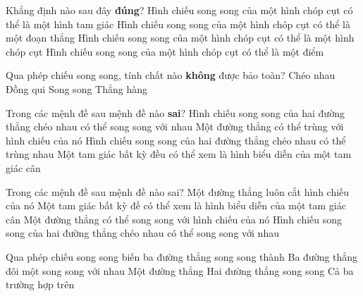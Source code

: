\begin{ex}%
	Khẳng định nào sau đây \textbf{đúng}? 
	 \choice
		{\True Hình chiếu song song của một hình chóp  cụt có thể là một hình tam giác}
		{Hình chiếu song song của một hình chóp cụt có  thể là một đoạn thẳng}
		{Hình chiếu song song của một hình chóp cụt có  thể là một hình chóp cụt}
		{Hình chiếu song song của một hình chóp cụt  có thể là một điểm}
\end{ex}

\begin{ex}%
	Qua  phép chiếu song song, tính chất nào \textbf{không} được bảo toàn?
	 \choice
		{\True  Chéo nhau}
		 {Đồng qui}
		 {Song song}
		{Thẳng hàng} 
\end{ex}

\begin{ex}%
	Trong các mệnh đề sau mệnh đề  nào \textbf{sai}?
	 \choice
		 {Hình chiếu song song của hai đường thẳng chéo nhau có thể song song với nhau}
		{Một đường thẳng  có thể trùng với hình chiếu của nó}
		{\True Hình chiếu song  song của hai đường thẳng chéo nhau có thể trùng nhau}
		{Một tam giác bất kỳ đều có thể xem là hình biểu diễn  của một tam giác cân}
\end{ex}

\begin{ex}%
	Trong các mệnh đề  sau mệnh đề nào sai?
	 \choice
		{\True Một đường thẳng luôn  cắt hình chiếu của nó}
		{Một tam giác bất kỳ đề  có thể xem là hình biểu diễn của một tam giác cân}
		{Một đường thẳng có thể song song với hình chiếu của nó} 
		{Hình chiếu song song của  hai đường thẳng chéo nhau có thể song song với nhau}
\end{ex}

\begin{ex}%
	Qua phép chiếu  song song biến ba đường thẳng song song thành
	\choice 
		{Ba đường thẳng đôi một song song  với nhau}
		{Một đường thẳng} 
		{Hai  đường thẳng song song}
		 {\True Cả ba trường hợp trên}
\end{ex}

